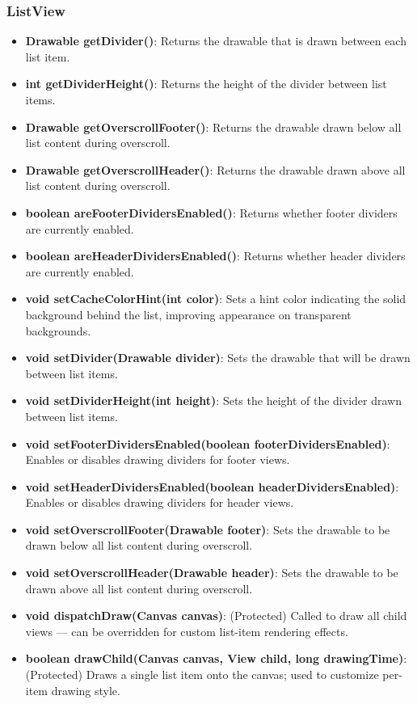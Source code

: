 \documentclass{report}
\begin{document}
\begin{itemize}
    \subsubsection{ListView}
    \begin{itemize}
        \item \textbf{Drawable getDivider()}: Returns the drawable that is drawn between each list item.
        \item \textbf{int getDividerHeight()}: Returns the height of the divider between list items.
        \item \textbf{Drawable getOverscrollFooter()}: Returns the drawable drawn below all list content during overscroll.
        \item \textbf{Drawable getOverscrollHeader()}: Returns the drawable drawn above all list content during overscroll.
        \item \textbf{boolean areFooterDividersEnabled()}: Returns whether footer dividers are currently enabled.
        \item \textbf{boolean areHeaderDividersEnabled()}: Returns whether header dividers are currently enabled.
        \item \textbf{void setCacheColorHint(int color)}: Sets a hint color indicating the solid background behind the list, improving appearance on transparent backgrounds.
        \item \textbf{void setDivider(Drawable divider)}: Sets the drawable that will be drawn between list items.
        \item \textbf{void setDividerHeight(int height)}: Sets the height of the divider drawn between list items.
        \item \textbf{void setFooterDividersEnabled(boolean footerDividersEnabled)}: Enables or disables drawing dividers for footer views.
        \item \textbf{void setHeaderDividersEnabled(boolean headerDividersEnabled)}: Enables or disables drawing dividers for header views.
        \item \textbf{void setOverscrollFooter(Drawable footer)}: Sets the drawable to be drawn below all list content during overscroll.
        \item \textbf{void setOverscrollHeader(Drawable header)}: Sets the drawable to be drawn above all list content during overscroll.
        \item \textbf{void dispatchDraw(Canvas canvas)}: (Protected) Called to draw all child views — can be overridden for custom list-item rendering effects.
        \item \textbf{boolean drawChild(Canvas canvas, View child, long drawingTime)}: (Protected) Draws a single list item onto the canvas; used to customize per-item drawing style.
    \end{itemize}



\end{itemize}
\end{document}
